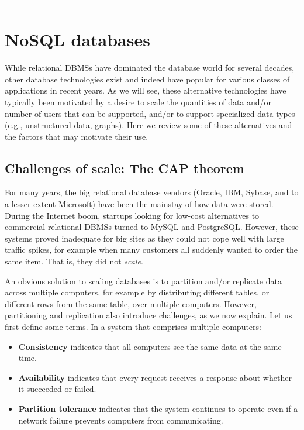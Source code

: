 \documentclass[]{krantz}
\begin{document}
\begin{center}\rule{0.5\linewidth}{\linethickness}\end{center}

\hypertarget{sec:db:nosql}{\section{NoSQL
databases}\label{sec:db:nosql}}

While relational DBMSs have dominated the database world for several
decades, other database technologies exist and indeed have popular for
various classes of applications in recent years. As we will see, these
alternative technologies have typically been motivated by a desire to
scale the quantities of data and/or number of users that can be
supported, and/or to support specialized data types (e.g., unstructured
data, graphs). Here we review some of these alternatives and the factors
that may motivate their use.

\subsection{Challenges of scale: The CAP
theorem}\label{challenges-of-scale-the-cap-theorem}

For many years, the big relational database vendors (Oracle, IBM,
Sybase, and to a lesser extent Microsoft) have been the mainstay of how
data were stored. During the Internet boom, startups looking for
low-cost alternatives to commercial relational DBMSs turned to MySQL and
PostgreSQL. However, these systems proved inadequate for big sites as
they could not cope well with large traffic spikes, for example when
many customers all suddenly wanted to order the same item. That is, they
did not \emph{scale}.

An obvious solution to scaling databases is to partition and/or
replicate data across multiple computers, for example by distributing
different tables, or different rows from the same table, over multiple
computers. However, partitioning and replication also introduce
challenges, as we now explain. Let us first define some terms. In a
system that comprises multiple computers:

\begin{itemize}
\item
  \textbf{Consistency} indicates that all computers see the same data at
  the same time.
\item
  \textbf{Availability} indicates that every request receives a response
  about whether it succeeded or failed.
\item
  \textbf{Partition tolerance} indicates that the system continues to
  operate even if a network failure prevents computers from
  communicating.
\end{itemize}
\end{document}
